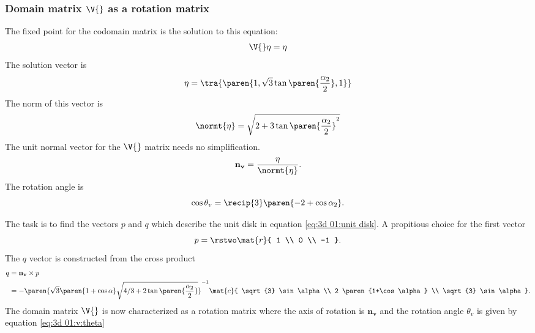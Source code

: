 \subsubsection{Domain matrix $\V{}$ as a rotation matrix}
The fixed point for the codomain matrix is the solution to this equation:
%
\begin{equation}
  \begin{split}
    \V{} \eta  &= \eta \\
  \end{split}
\end{equation}
%
The solution vector is
%
\begin{equation}
  \eta = \tra{\paren{
   1, \sqrt{3} \tan \paren{\frac{\alpha_{2}}{2}}, 1 }}
\end{equation}
The norm of this vector is
%
\begin{equation}
  \normt{ \eta } = \sqrt{2 + 3 \tan \paren{\frac{\alpha_{2}}{2}} ^2}
\end{equation}
The unit normal vector for the $\V{}$ matrix needs no simplification.
%
\begin{equation}
  \mathbf{n_{v}} = \frac{ \eta } { \normt{ \eta } }.
  \label{eq:3d 01:v:theta}
\end{equation}%
%
The rotation angle is
%
\begin{equation}
  \cos \theta_{v} = \recip{3} \paren{-2 + \cos \alpha_{2}} .
  \label{eq:3d 01:v:theta}
\end{equation}

The task is to find the vectors $p$ and $q$ which describe the unit disk in equation \eqref{eq:3d 01:unit disk}. A propitious choice for the first vector
\begin{equation}
  p = \rstwo \mat{r}{ 1 \\ 0 \\ -1 }.
\end{equation}
The $q$ vector is constructed from the cross product
\begin{equation}
\begin{split}
  q &= \mathbf{n_{v}} \times p \\
    &= -\paren{ \sqrt{3} \paren{1 + \cos \alpha} \sqrt{ 4/3 + 2 \tan \paren{\frac{\alpha_{2}}{2}}}}^{-1}
        \mat{c}{
        \sqrt{3} \sin \alpha \\ 
        2 \paren{1+\cos \alpha} \\ 
        \sqrt{3} \sin \alpha
        } .
\end{split}
\end{equation}
The domain matrix $\V{}$ is now characterized as a rotation matrix where the axis of rotation is $\mathbf{n_{v}}$ and the rotation angle $\theta_{v}$ is given by equation \eqref{eq:3d 01:v:theta}

